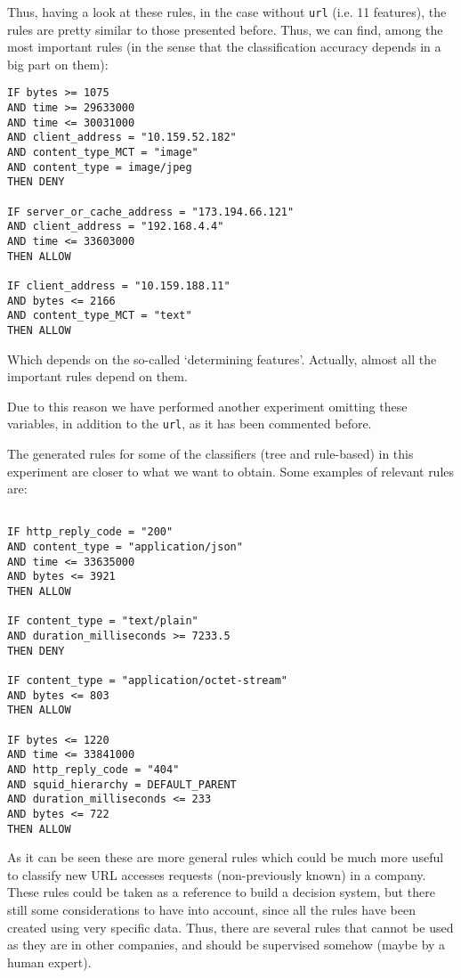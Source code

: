 \documentclass{llncs}
\begin{document}
Thus, having a look at these rules, in the case without \texttt{url} (i.e. 11 features), the rules are pretty similar to those presented before. Thus, we can find, among the most important rules (in the sense that the classification accuracy depends in a big part on them): 

\begin{small}
\begin{verbatim}
IF bytes >= 1075
AND time >= 29633000
AND time <= 30031000
AND client_address = "10.159.52.182"
AND content_type_MCT = "image"
AND content_type = image/jpeg
THEN DENY

IF server_or_cache_address = "173.194.66.121" 
AND client_address = "192.168.4.4"
AND time <= 33603000
THEN ALLOW

IF client_address = "10.159.188.11"
AND bytes <= 2166 
AND content_type_MCT = "text"
THEN ALLOW
\end{verbatim}
\end{small}

Which depends on the so-called `determining features'. Actually, almost all the important rules depend on them.

Due to this reason we have performed another experiment omitting these variables, in addition to the \texttt{url}, as it has been commented before.

The generated rules for some of the classifiers (tree and rule-based) in this experiment are closer to what we want to obtain. Some examples of relevant rules are:

\begin{small}
\begin{verbatim}

IF http_reply_code = "200"
AND content_type = "application/json"
AND time <= 33635000
AND bytes <= 3921
THEN ALLOW

IF content_type = "text/plain"
AND duration_milliseconds >= 7233.5 
THEN DENY

IF content_type = "application/octet-stream"
AND bytes <= 803
THEN ALLOW

IF bytes <= 1220
AND time <= 33841000
AND http_reply_code = "404"
AND squid_hierarchy = DEFAULT_PARENT
AND duration_milliseconds <= 233
AND bytes <= 722
THEN ALLOW
\end{verbatim}
\end{small}

As it can be seen these are more general rules which could be much more useful to classify new URL accesses requests (non-previously known) in a company.
These rules could be taken as a reference to build a decision system, but there still some considerations to have into account, since all the rules have been created using very specific data. Thus, there are several rules that cannot be used as they are in other companies, and should be supervised somehow (maybe by a human expert).
\end{document}
